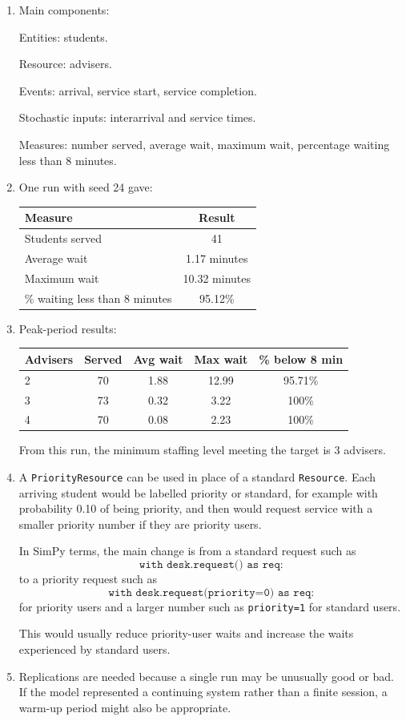 \documentclass[11pt,a4paper]{article}
\begin{document}
\begin{enumerate}
\item Main components:

Entities: students.

Resource: advisers.

Events: arrival, service start, service completion.

Stochastic inputs: interarrival and service times.

Measures: number served, average wait, maximum wait, percentage waiting less than 8 minutes.

\item One run with seed 24 gave:

\begin{center}
\begin{tabular}{lc}
\toprule
Measure & Result \\
\midrule
Students served & 41 \\
Average wait & 1.17 minutes \\
Maximum wait & 10.32 minutes \\
\% waiting less than 8 minutes & 95.12\% \\
\bottomrule
\end{tabular}
\end{center}

\item Peak-period results:

\begin{center}
\begin{tabular}{lcccc}
\toprule
Advisers & Served & Avg wait & Max wait & \% below 8 min \\
\midrule
2 & 70 & 1.88 & 12.99 & 95.71\% \\
3 & 73 & 0.32 & 3.22 & 100\% \\
4 & 70 & 0.08 & 2.23 & 100\% \\
\bottomrule
\end{tabular}
\end{center}

From this run, the minimum staffing level meeting the target is 3 advisers.

\item A \texttt{PriorityResource} can be used in place of a standard \texttt{Resource}. Each arriving student would be labelled priority or standard, for example with probability 0.10 of being priority, and then would request service with a smaller priority number if they are priority users.

In SimPy terms, the main change is from a standard request such as
\[
\texttt{with desk.request() as req:}
\]
to a priority request such as
\[
\texttt{with desk.request(priority=0) as req:}
\]
for priority users and a larger number such as \texttt{priority=1} for standard users.

This would usually reduce priority-user waits and increase the waits experienced by standard users.

\item Replications are needed because a single run may be unusually good or bad. If the model represented a continuing system rather than a finite session, a warm-up period might also be appropriate.
\end{enumerate}
\end{document}
